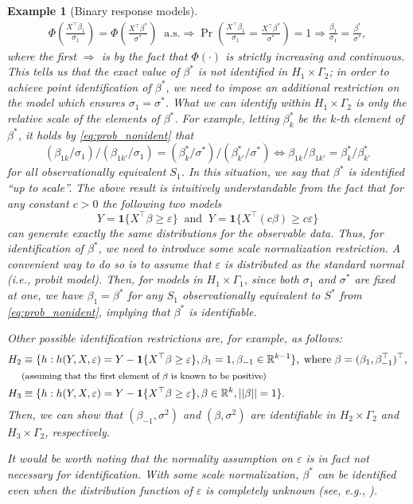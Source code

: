 \documentclass[10.5pt, A4paper, openany, uplatex]{book}
\newcommand{\mbf}{\mathbf}
\newcommand{\mbb}{\mathbb}
\newcommand{\eps}{\varepsilon}
\newtheorem{example}[theorem]{Example}
\numberwithin{equation}{section}
\begin{document}
\begin{example}[Binary response models]
\begin{align}\label{eq:prob_nonident}
	\Phi \left( \frac{X^\top \beta_1}{\sigma_1} \right) = \Phi \left( \frac{X^\top \beta^*}{\sigma^*} \right ) \;\; \text{a.s.}
	\Longrightarrow \Pr\left(\frac{X^\top \beta_1}{\sigma_1} = \frac{X^\top \beta^*}{\sigma^*}\right) = 1
	\Longrightarrow \frac{\beta_1}{\sigma_1} = \frac{\beta^*}{\sigma^*},
\end{align}
where the first $\Longrightarrow$ is by the fact that $\Phi(\cdot)$ is strictly increasing and continuous.
This tells us that the exact value of $\beta^*$ is not identified in $H_1 \times \Gamma_2$; in order to achieve point identification of $\beta^*$, we need to impose an additional restriction on the model which ensures $\sigma_1 = \sigma^*$.
What we can identify within $H_1 \times \Gamma_2$ is only the relative scale of the elements of $\beta^*$.
For example, letting $\beta_{k}^*$ be the $k$-th element of $\beta^*$, it holds by \eqref{eq:prob_nonident} that
\[
	(\beta_{1k}/\sigma_1)/(\beta_{1k'}/\sigma_1) = (\beta_{k}^*/\sigma^*)/(\beta_{k'}^*/\sigma^*) \iff \beta_{1k}/\beta_{1k'} = \beta_{k}^*/\beta_{k'}^*
\]
for all observationally equivalent $S_1$.
In this situation, we say that  $\beta^*$ is identified ``up to scale''.
The above result is intuitively understandable from the fact that for any constant $c > 0$ the following two models
\[
	Y = \mbf{1}\{ X^\top \beta \ge \eps \} \;\; \text{and} \;\; Y = \mbf{1}\{ X^\top(c \beta) \ge c\eps\}
\]
can generate exactly the same distributions for the observable data.
Thus, for identification of  $\beta^*$, we need to introduce some scale normalization restriction.
A convenient way to do so is to assume that $\eps$ is distributed as the standard normal (i.e., probit model).
Then, for models in $H_1 \times \Gamma_1$, since both $\sigma_1$ and $\sigma^*$ are fixed at one, we have $\beta_1 =  \beta^*$ for any $S_1$ observationally equivalent to $S^*$ from \eqref{eq:prob_nonident}, implying that  $\beta^*$ is identifiable.

Other possible identification restrictions are, for example, as follows:
\begin{align*}
	H_2 
	& \equiv \{h : h(Y, X, \eps) = Y - \mbf{1}\{ X^\top \beta \ge \eps\} ,  \beta_1 = 1,  \beta_{-1} \in \mbb{R}^{k-1}\}, \; \text{where }  \beta = ( \beta_1,  \beta^\top_{-1})^\top,\\
	& \footnotesize{\text{(assuming that the first element of  $\beta$ is known to be positive)}} \\
	H_3
	& \equiv \{h : h(Y, X, \eps) = Y - \mbf{1}\{ X^\top \beta \ge \eps \} , \beta \in \mbb{R}^k, || \beta|| = 1\}.
\end{align*}
Then, we can show that $( \beta_{-1}, \sigma^2)$ and $(\beta, \sigma^2)$ are identifiable in $H_2 \times \Gamma_2$ and $H_3 \times \Gamma_2$, respectively.

It would be worth noting that the normality assumption on $\eps$ is in fact not necessary for identification.
With some scale normalization,  $\beta^*$ can be identified even when the distribution function of $\eps$ is completely unknown (see, e.g., \cite{manski1975maximum}).
\end{example}
\end{document}
